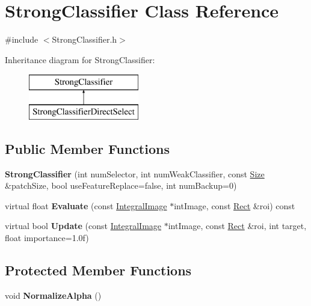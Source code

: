 \hypertarget{classStrongClassifier}{}\section{Strong\+Classifier Class Reference}
\label{classStrongClassifier}


{\ttfamily \#include $<$Strong\+Classifier.\+h$>$}

Inheritance diagram for Strong\+Classifier\+:\begin{figure}[H]
\begin{center}
\leavevmode
\includegraphics[height=2.000000cm]{classStrongClassifier}
\end{center}
\end{figure}
\subsection*{Public Member Functions}
\begin{DoxyCompactItemize}
\item 
\hypertarget{classStrongClassifier_a98f65a1c2088937ce66f08dc710b178a}{}{\bfseries Strong\+Classifier} (int num\+Selector, int num\+Weak\+Classifier, const \hyperlink{classSize}{Size} \&patch\+Size, bool use\+Feature\+Replace=false, int num\+Backup=0)\label{classStrongClassifier_a98f65a1c2088937ce66f08dc710b178a}

\item 
\hypertarget{classStrongClassifier_a7f2079d46afe7a49cef73a1d8b5fc61d}{}virtual float {\bfseries Evaluate} (const \hyperlink{classIntegralImage}{Integral\+Image} $\ast$int\+Image, const \hyperlink{classRect}{Rect} \&roi) const \label{classStrongClassifier_a7f2079d46afe7a49cef73a1d8b5fc61d}

\item 
\hypertarget{classStrongClassifier_ac6515ad2049961798844049c3ba1e2d6}{}virtual bool {\bfseries Update} (const \hyperlink{classIntegralImage}{Integral\+Image} $\ast$int\+Image, const \hyperlink{classRect}{Rect} \&roi, int target, float importance=1.\+0f)\label{classStrongClassifier_ac6515ad2049961798844049c3ba1e2d6}

\end{DoxyCompactItemize}
\subsection*{Protected Member Functions}
\begin{DoxyCompactItemize}
\item 
\hypertarget{classStrongClassifier_a475d324ff23806e652b8086fe637606a}{}void {\bfseries Normalize\+Alpha} ()\label{classStrongClassifier_a475d324ff23806e652b8086fe637606a}

\end{DoxyCompactItemize}
